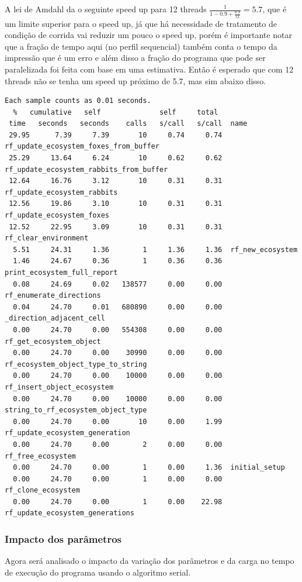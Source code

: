 \documentclass[12pt]{article}
\begin{document}
A lei de Amdahl da o seguinte speed up para 12 threads $\frac{1}{1-0.9+\frac{0.9}{12}} = 5.7$, que é um limite superior para o speed up, já que há necessidade de tratamento de condição de corrida vai reduzir um pouco o speed up, porém é importante notar que a fração de tempo aqui (no perfil sequencial) também conta o tempo da impressão que é um erro e além disso a fração do programa que pode ser paralelizada foi feita com base em uma estimativa. Então é esperado que com 12 threads não se tenha um speed up próximo de 5.7, mas sim abaixo disso.

	{
		\scriptsize
		\begin{verbatim}
Each sample counts as 0.01 seconds.
  %   cumulative   self              self     total           
 time   seconds   seconds    calls   s/call   s/call  name    
 29.95      7.39     7.39       10     0.74     0.74  rf_update_ecosystem_foxes_from_buffer
 25.29     13.64     6.24       10     0.62     0.62  rf_update_ecosystem_rabbits_from_buffer
 12.64     16.76     3.12       10     0.31     0.31  rf_update_ecosystem_rabbits
 12.56     19.86     3.10       10     0.31     0.31  rf_update_ecosystem_foxes
 12.52     22.95     3.09       10     0.31     0.31  rf_clear_environment
  5.51     24.31     1.36        1     1.36     1.36  rf_new_ecosystem
  1.46     24.67     0.36        1     0.36     0.36  print_ecosystem_full_report
  0.08     24.69     0.02   138577     0.00     0.00  rf_enumerate_directions
  0.04     24.70     0.01   680890     0.00     0.00  _direction_adjacent_cell
  0.00     24.70     0.00   554308     0.00     0.00  rf_get_ecosystem_object
  0.00     24.70     0.00    30990     0.00     0.00  rf_ecosystem_object_type_to_string
  0.00     24.70     0.00    10000     0.00     0.00  rf_insert_object_ecosystem
  0.00     24.70     0.00    10000     0.00     0.00  string_to_rf_ecosystem_object_type
  0.00     24.70     0.00       10     0.00     1.99  rf_update_ecosystem_generation
  0.00     24.70     0.00        2     0.00     0.00  rf_free_ecosystem
  0.00     24.70     0.00        1     0.00     1.36  initial_setup
  0.00     24.70     0.00        1     0.00     0.00  rf_clone_ecosystem
  0.00     24.70     0.00        1     0.00    22.98  rf_update_ecosystem_generations
\end{verbatim}
	}
\subsubsection{Impacto dos parâmetros}

Agora será analisado o impacto da variação dos parâmetros e da carga no tempo de execução do programa usando o algoritmo serial.
\end{document}

